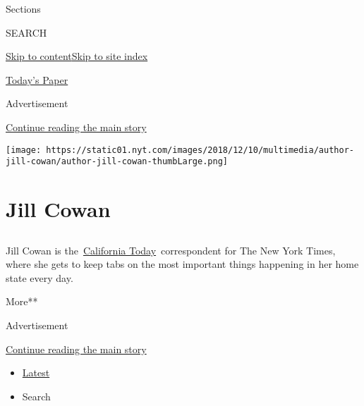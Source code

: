 Sections

SEARCH

\protect\hyperlink{site-content}{Skip to
content}\protect\hyperlink{site-index}{Skip to site index}

\href{https://myaccount.nytimes.com/auth/login?response_type=cookie\&client_id=vi}{}

\href{https://www.nytimes.com/section/todayspaper}{Today's Paper}

Advertisement

\protect\hyperlink{after-top}{Continue reading the main story}

\texttt{[image: https://static01.nyt.com/images/2018/12/10/multimedia/author-jill-cowan/author-jill-cowan-thumbLarge.png]}

\hypertarget{jill-cowan}{%
\section{Jill Cowan}\label{jill-cowan}}

\subsection{}

Jill Cowan is
the~\href{https://www.nytimes.com/column/california-today}{Californ}\href{https://www.nytimes.com/column/california-today}{ia
Today}~correspondent for The New York Times, where she gets to keep tabs
on the most important things happening in her home state every day.

More**

Advertisement

\protect\hyperlink{after-mid1}{Continue reading the main story}

\begin{itemize}
\tightlist
\item
  \protect\hyperlink{stream-panel}{Latest}
\item
  Search
\end{itemize}

